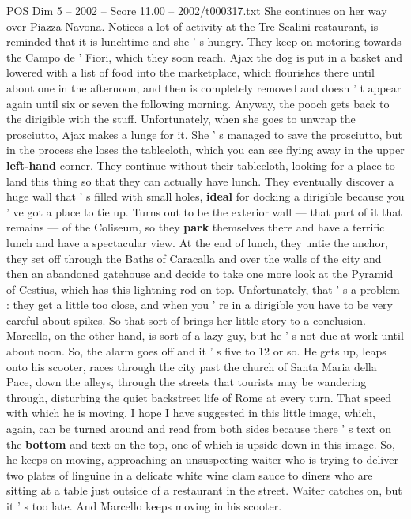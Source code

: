 \begin{textsample}{POS Dim 5 – 2002 – Score 11.00 – 2002/t000317.txt}
She continues on her way over Piazza Navona.
Notices a lot of activity at the Tre Scalini restaurant, is reminded that it is lunchtime and she ' s hungry.
They keep on motoring towards the Campo de ' Fiori, which they soon reach.
Ajax the dog is put in a basket and lowered with a list of food into the marketplace, which flourishes there until about one in the afternoon, and then is completely removed and doesn ' t appear again until six or seven the following morning.
Anyway, the pooch gets back to the dirigible with the stuff.
Unfortunately, when she goes to unwrap the prosciutto, Ajax makes a lunge for it.
She ' s managed to save the prosciutto, but in the process she loses the tablecloth, which you can see flying away in the upper \textbf{left-hand} corner.
They continue without their tablecloth, looking for a place to land this thing so that they can actually have lunch.
They eventually discover a huge wall that ' s filled with small holes, \textbf{ideal} for docking a dirigible because you ' ve got a place to tie up.
Turns out to be the exterior wall — that part of it that remains — of the Coliseum, so they \textbf{park} themselves there and have a terrific lunch and have a spectacular view.
At the end of lunch, they untie the anchor, they set off through the Baths of Caracalla and over the walls of the city and then an abandoned gatehouse and decide to take one more look at the Pyramid of Cestius, which has this lightning rod on top.
Unfortunately, that ' s a problem : they get a little too close, and when you ' re in a dirigible you have to be very careful about spikes.
So that sort of brings her little story to a conclusion.
Marcello, on the other hand, is sort of a lazy guy, but he ' s not due at work until about noon.
So, the alarm goes off and it ' s five to 12 or so.
He gets up, leaps onto his scooter, races through the city past the church of Santa Maria della Pace, down the alleys, through the streets that tourists may be wandering through, disturbing the quiet backstreet life of Rome at every turn.
That speed with which he is moving, I hope I have suggested in this little image, which, again, can be turned around and read from both sides because there ' s text on the \textbf{bottom} and text on the top, one of which is upside down in this image.
So, he keeps on moving, approaching an unsuspecting waiter who is trying to deliver two plates of linguine in a delicate white wine clam sauce to diners who are sitting at a table just outside of a restaurant in the street.
Waiter catches on, but it ' s too late.
And Marcello keeps moving in his scooter.

\end{textsample}
